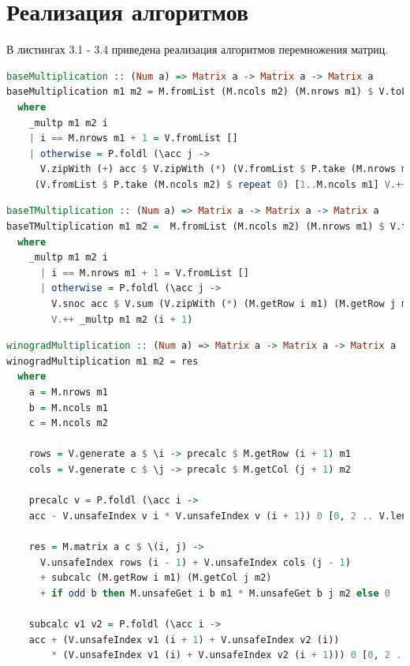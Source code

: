 \documentclass[12pt]{report}
\begin{document}
\section{Реализация алгоритмов}

В листингах 3.1 - 3.4 приведена реализация алгоритмов перемножения матриц.

\begin{lstlisting}[label=some-code,caption=Функция умножения матриц обычным способом, language=Haskell]
baseMultiplication :: (Num a) => Matrix a -> Matrix a -> Matrix a
baseMultiplication m1 m2 = M.fromList (M.ncols m2) (M.nrows m1) $ V.toList $ _multp m1 m2 1
  where
    _multp m1 m2 i
    | i == M.nrows m1 + 1 = V.fromList []
    | otherwise = P.foldl (\acc j ->
      V.zipWith (+) acc $ V.zipWith (*) (V.fromList $ P.take (M.nrows m1) $ repeat (M.getElem i j m1)) (M.getRow j m2))
     (V.fromList $ P.take (M.ncols m2) $ repeat 0) [1..M.ncols m1] V.++ _multp m1 m2 (i + 1)
\end{lstlisting}

\begin{lstlisting}[label=some-code,caption=Функция умножения матриц с транспонированием,language=Haskell]
baseTMultiplication :: (Num a) => Matrix a -> Matrix a -> Matrix a
baseTMultiplication m1 m2 =  M.fromList (M.ncols m2) (M.nrows m1) $ V.toList $ _multp m1 (M.transpose m2) 1
  where
    _multp m1 m2 i
      | i == M.nrows m1 + 1 = V.fromList []
      | otherwise = P.foldl (\acc j ->
        V.snoc acc $ V.sum (V.zipWith (*) (M.getRow i m1) (M.getRow j m2))) (V.fromList []) [1..M.nrows m2]
        V.++ _multp m1 m2 (i + 1)
\end{lstlisting}

\begin{lstlisting}[label=some-code,caption=Функция умножения матриц по Винограду,language=Haskell]
winogradMultiplication :: (Num a) => Matrix a -> Matrix a -> Matrix a
winogradMultiplication m1 m2 = res
  where
    a = M.nrows m1
    b = M.ncols m1
    c = M.ncols m2

    rows = V.generate a $ \i -> precalc $ M.getRow (i + 1) m1
    cols = V.generate c $ \j -> precalc $ M.getCol (j + 1) m2

    precalc v = P.foldl (\acc i ->
    acc - V.unsafeIndex v i * V.unsafeIndex v (i + 1)) 0 [0, 2 .. V.length v - 2]
	
    res = M.matrix a c $ \(i, j) ->
      V.unsafeIndex rows (i - 1) + V.unsafeIndex cols (j - 1)
      + subcalc (M.getRow i m1) (M.getCol j m2)
      + if odd b then M.unsafeGet i b m1 * M.unsafeGet b j m2 else 0
	
    subcalc v1 v2 = P.foldl (\acc i ->
    acc + (V.unsafeIndex v1 (i + 1) + V.unsafeIndex v2 (i))
        * (V.unsafeIndex v1 (i) + V.unsafeIndex v2 (i + 1))) 0 [0, 2 .. V.length v1 - 2]
\end{lstlisting}
\end{document}
